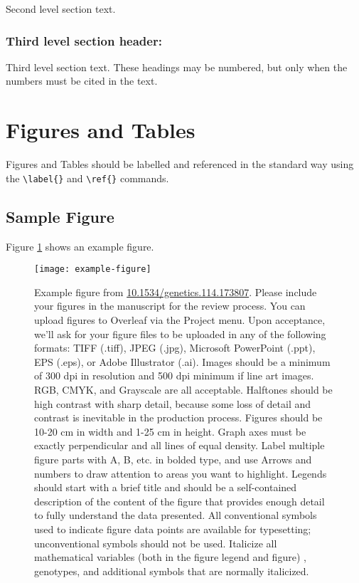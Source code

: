 \documentclass[9pt,twocolumn,twoside]{gsajnl}
\begin{document}
Second level section text.

\subsubsection{Third level section header:}

Third level section text. These headings may be numbered, but only when the numbers must be cited in the text. 

\section{Figures and Tables}

Figures and Tables should be labelled and referenced in the standard way using the \verb|\label{}| and \verb|\ref{}| commands.

\subsection{Sample Figure}

Figure \ref{fig:spectrum} shows an example figure.

\begin{figure}[htbp]
\centering
\texttt{[image: example-figure]}
\caption{Example figure from \url{10.1534/genetics.114.173807}. Please include your figures in the manuscript for the review process. You can upload figures to Overleaf via the Project menu. Upon acceptance, we'll ask for your figure files to be uploaded in any of the following formats: TIFF (.tiff), JPEG (.jpg), Microsoft PowerPoint (.ppt), EPS (.eps), or Adobe Illustrator (.ai).  Images should be a minimum of 300 dpi in resolution and 500 dpi minimum if line art images.  RGB, CMYK, and Grayscale are all acceptable. Halftones should be high contrast with sharp detail, because some loss of detail and contrast is inevitable in the production process. Figures should be 10-20 cm in width and 1-25 cm in height. Graph axes must be exactly perpendicular and all lines of equal density.
Label multiple figure parts with A, B, etc. in bolded type, and use Arrows and numbers to draw attention to areas you want to highlight. Legends should start with a brief title and should be a self-contained description of the content of the figure that provides enough detail to fully understand the data presented. All conventional symbols used to indicate figure data points are available for typesetting; unconventional symbols should not be used. Italicize all mathematical variables (both in the figure legend and figure) , genotypes, and additional symbols that are normally italicized.  
}%
\label{fig:spectrum}
\end{figure}
\end{document}
